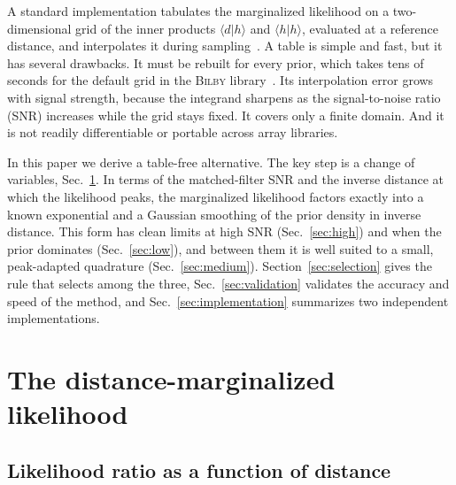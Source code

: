 \documentclass[prd,twocolumn,nofootinbib,superscriptaddress,amsmath,amssymb]{revtex4-2}
\begin{document}
A standard implementation tabulates the marginalized likelihood on a two-dimensional grid of the inner products $\langle d|h\rangle$ and $\langle h|h\rangle$,
evaluated at a reference distance,
and interpolates it during sampling~\cite{Thrane2019,Roulet2024}.
A table is simple and fast,
but it has several drawbacks.
It must be rebuilt for every prior,
which takes tens of seconds for the default grid in the \textsc{Bilby} library~\cite{Ashton2019}.
Its interpolation error grows with signal strength,
because the integrand sharpens as the signal-to-noise ratio (SNR) increases while the grid stays fixed.
It covers only a finite domain.
And it is not readily differentiable or portable across array libraries.

In this paper we derive a table-free alternative.
The key step is a change of variables,
Sec.~\ref{sec:likelihood}.
In terms of the matched-filter SNR and the inverse distance at which the likelihood peaks,
the marginalized likelihood factors exactly into a known exponential and a Gaussian smoothing of the prior density in inverse distance.
This form has clean limits at high SNR (Sec.~\ref{sec:high}) and when the prior dominates (Sec.~\ref{sec:low}),
and between them it is well suited to a small,
peak-adapted quadrature (Sec.~\ref{sec:medium}).
Section~\ref{sec:selection} gives the rule that selects among the three,
Sec.~\ref{sec:validation} validates the accuracy and speed of the method,
and Sec.~\ref{sec:implementation} summarizes two independent implementations.

\section{The distance-marginalized likelihood}
\label{sec:likelihood}

\subsection{Likelihood ratio as a function of distance}
\end{document}
